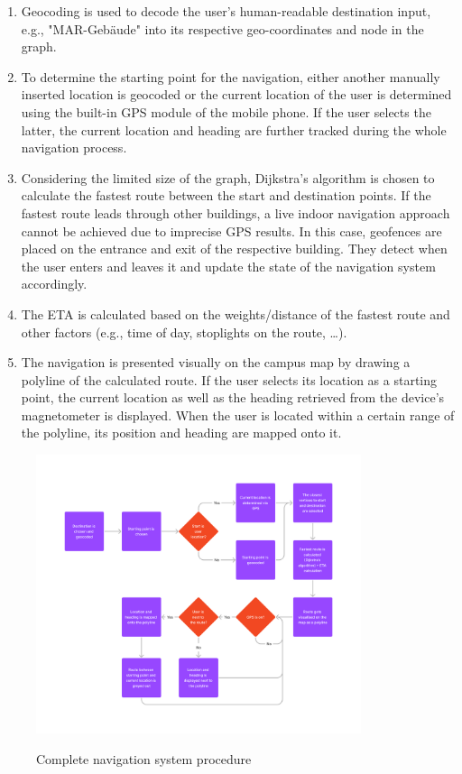 \begin{enumerate}
    \item Geocoding is used to decode the user's human-readable destination input, e.g., "MAR-Gebäude" into its respective geo-coordinates and node in the graph.
    \item To determine the starting point for the navigation, either another manually inserted location is geocoded or the current location of the user is determined using the built-in GPS module of the mobile phone. If the user selects the latter, the current location and heading are further tracked during the whole navigation process.
    \item Considering the limited size of the graph, Dijkstra's algorithm is chosen to calculate the fastest route between the start and destination points. If the fastest route leads through other buildings, a live indoor navigation approach cannot be achieved due to imprecise GPS results. In this case, geofences are placed on the entrance and exit of the respective building. They detect when the user enters and leaves it and update the state of the navigation system accordingly.
    \item The ETA is calculated based on the weights/distance of the fastest route and other factors (e.g., time of day, stoplights on the route, \ldots).
    \item The navigation is presented visually on the campus map by drawing a polyline of the calculated route. If the user selects its location as a starting point, the current location as well as the heading retrieved from the device's magnetometer is displayed. When the user is located within a certain range of the polyline, its position and heading are mapped onto it.
\end{enumerate}

\begin{figure}[!ht]
	\centering
	\includegraphics[width=0.85\textwidth]{images/navigation_process.png}\\
	\caption{Complete navigation system procedure}
	\label{fig:introduction__loremipsum}
\end{figure}


